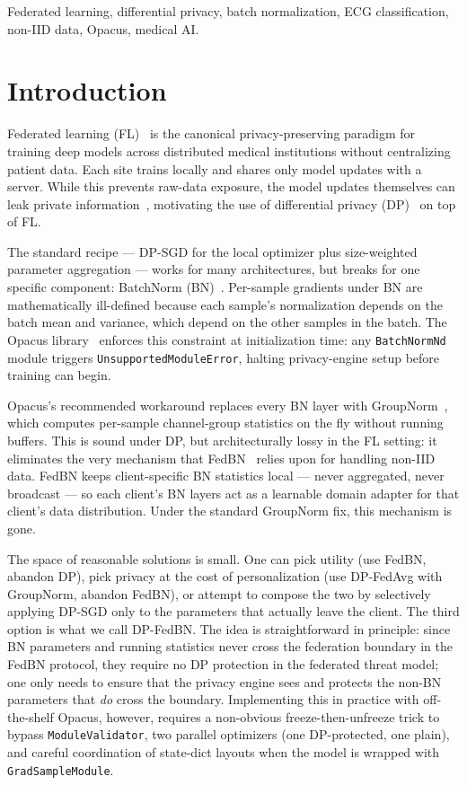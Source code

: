 \documentclass[conference]{IEEEtran}
\newcommand{\code}[1]{\texttt{\small #1}}
\begin{document}
\begin{IEEEkeywords}
Federated learning, differential privacy, batch normalization, ECG classification, non-IID data, Opacus, medical AI.
\end{IEEEkeywords}

\section{Introduction}
Federated learning (FL)~\cite{fedavg,rieke} is the canonical privacy-preserving paradigm for training deep models across distributed medical institutions without centralizing patient data. Each site trains locally and shares only model updates with a server. While this prevents raw-data exposure, the model updates themselves can leak private information~\cite{geyer}, motivating the use of differential privacy (DP)~\cite{abadi} on top of FL.

The standard recipe --- DP-SGD for the local optimizer plus size-weighted parameter aggregation --- works for many architectures, but breaks for one specific component: BatchNorm (BN)~\cite{batchnorm}. Per-sample gradients under BN are mathematically ill-defined because each sample's normalization depends on the batch mean and variance, which depend on the other samples in the batch. The Opacus library~\cite{opacus} enforces this constraint at initialization time: any \code{BatchNormNd} module triggers \code{UnsupportedModuleError}, halting privacy-engine setup before training can begin.

Opacus's recommended workaround replaces every BN layer with GroupNorm~\cite{groupnorm}, which computes per-sample channel-group statistics on the fly without running buffers. This is sound under DP, but architecturally lossy in the FL setting: it eliminates the very mechanism that FedBN~\cite{fedbn} relies upon for handling non-IID data. FedBN keeps client-specific BN statistics local --- never aggregated, never broadcast --- so each client's BN layers act as a learnable domain adapter for that client's data distribution. Under the standard GroupNorm fix, this mechanism is gone.

The space of reasonable solutions is small. One can pick utility (use FedBN, abandon DP), pick privacy at the cost of personalization (use DP-FedAvg with GroupNorm, abandon FedBN), or attempt to compose the two by selectively applying DP-SGD only to the parameters that actually leave the client. The third option is what we call DP-FedBN. The idea is straightforward in principle: since BN parameters and running statistics never cross the federation boundary in the FedBN protocol, they require no DP protection in the federated threat model; one only needs to ensure that the privacy engine sees and protects the non-BN parameters that \emph{do} cross the boundary. Implementing this in practice with off-the-shelf Opacus, however, requires a non-obvious freeze-then-unfreeze trick to bypass \code{ModuleValidator}, two parallel optimizers (one DP-protected, one plain), and careful coordination of state-dict layouts when the model is wrapped with \code{GradSampleModule}.
\end{document}
